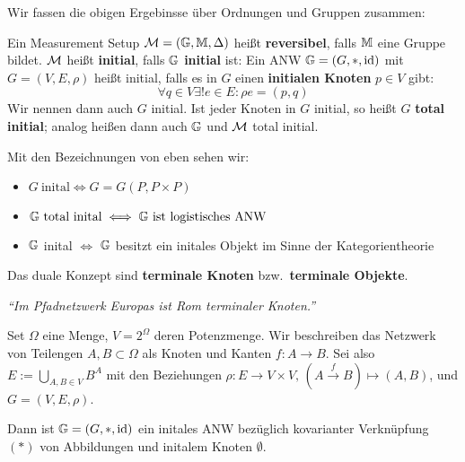 Wir fassen die obigen Ergebinsse über Ordnungen und Gruppen zusammen:
\begin{definition}
    Ein Measurement Setup $\mathcal{M} = (\mathbb{G}, \mathbb{M}, \Delta)$ heißt \textbf{reversibel},
    falls $\mathbb{M}$ eine Gruppe bildet.
    $\mathcal{M}$ heißt \textbf{initial}, falls $\mathbb{G}$ \textbf{initial} ist:
    Ein ANW $\mathbb{G} = (G, *, \operatorname{id})$ mit $G = (V, E, \rho)$ heißt initial, falls es in $G$ einen \textbf{initialen Knoten} $p\in V$ gibt:
    \[
        \forall q\in V\exists!e\in E\colon \rho e = (p, q)
    \]
    Wir nennen dann auch $G$ initial.
    Ist jeder Knoten in $G$ initial, so heißt $G$ \textbf{total initial};
    analog heißen dann auch $\mathbb{G}$ und $\mathcal{M}$ total initial.
\end{definition}
Mit den Bezeichnungen von eben sehen wir:
\begin{itemize}
    \item $G~\text{inital} \iff G = G(P, P\times P)$
    \item $\mathbb{G}~\text{total inital} \iff \mathbb{G}~\text{ist logistisches ANW}$
    \item $\mathbb{G}$ inital $\iff$ $\mathbb{G}$ besitzt ein initales Objekt im Sinne der Kategorientheorie
\end{itemize}
Das duale Konzept sind \textbf{terminale Knoten} bzw.~\textbf{terminale Objekte}.
\begin{displayquote}
    \textit{\enquote{Im Pfadnetzwerk Europas ist Rom terminaler Knoten.}}
\end{displayquote}
\begin{beispiel}
    Set $\Omega$ eine Menge, $V = 2^\Omega$ deren Potenzmenge.
    Wir beschreiben das Netzwerk von Teilengen $A, B\subset \Omega$ als Knoten und Kanten $f\colon A\to B$.
    Sei also $E := \bigcup_{A, B\in V} B^A$ mit den Beziehungen
    $\rho\colon E\to V\times V,\, (A\xrightarrow{f} B) \mapsto (A, B)$,
    und $G = (V, E, \rho)$.

    Dann ist $\mathbb{G} = (G, *, \operatorname{id})$ ein initales ANW bezüglich kovarianter Verknüpfung $(*)$ von Abbildungen und initalem Knoten $\emptyset$.
\end{beispiel}

